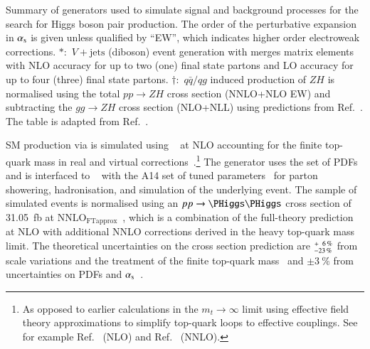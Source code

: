 \begin{sidewaystable}[p]
  \centering

  \caption[Summary of generators used to simulate signal and background
  processes for the search for Higgs boson pair production.]{Summary of
    generators used to simulate signal and background processes for the search
    for Higgs boson pair production. The order of the perturbative expansion in
    $\alpha_{\text{s}}$ is given unless qualified by ``EW'', which indicates higher order
    electroweak corrections. $*$:~$V+\text{jets}$ (diboson) event generation
    with \SHERPA[2.2.1] merges matrix elements with NLO accuracy for up to two
    (one) final state partons and LO accuracy for up to four (three) final state
    partons. $\dagger$:~$q\bar{q} / qg$ induced production of $ZH$ is normalised
    using the total $pp \to ZH$ cross section (NNLO+NLO EW) and subtracting the
    $gg \to ZH$ cross section (NLO+NLL) using predictions from
    Ref.~\cite{deFlorian:2016spz_book}. The table is adapted from
    Ref.~\cite{HDBS-2018-40}.}%
  \label{tab:monte_carlo}

  \resizebox{\textwidth}{!}{}
\end{sidewaystable}

SM \HH production via \ggF is simulated using
\POWHEGBOX[v2]~\cite{Nason:2004rx,Frixione:2007vw,Alioli:2010xd} at NLO
accounting for the finite top-quark mass in real and virtual
corrections~\cite{Borowka:2016ehy,Baglio:2018lrj,Heinrich:2017kxx,Heinrich:2019bkc,Heinrich:2020ckp}.\footnote{As
  opposed to earlier calculations in the $m_{t} \to \infty$ limit using
  effective field theory approximations to simplify top-quark loops to effective
  couplings. See for example Ref.~\cite{Dawson:1998py} (NLO) and
  Ref.~\cite{deFlorian:2013jea} (NNLO).} The generator uses the
\PDFforLHC[15nlo] set of PDFs~\cite{Butterworth:2015oua} and is interfaced to
\PYTHIA[8]~\cite{Sjostrand:2014zea} with the A14 set of tuned
parameters~\cite{ATL-PHYS-PUB-2014-021} for parton showering, hadronisation, and
simulation of the underlying event. The sample of simulated events is normalised
using an $\pp \to \HH$ cross section of \SI{31.05}{\femto\barn} at
$\text{NNLO}_{\text{FTapprox}}$~\cite{Grazzini:2018bsd}, which is a combination
of the full-theory prediction at NLO with additional NNLO corrections derived in
the heavy top-quark mass limit. The theoretical uncertainties on the cross
section prediction are
$^{\hspace{0.25pt}+\hspace{0.25pt}\phantom{0}6\,\%}_{-23\,\%}$ from scale
variations and the treatment of the finite top-quark mass~\cite{Baglio:2020wgt}
and $\pm\SI{3}{\percent}$ from uncertainties on PDFs and
$\alpha_{\text{s}}$~\cite{LHCHWGHH}.

